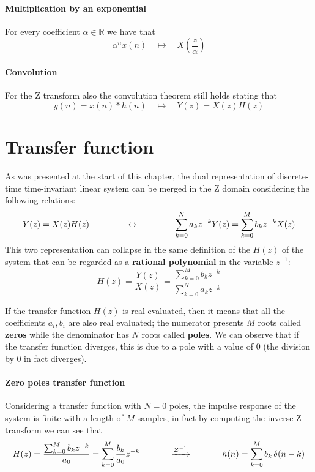 		\paragraph{Multiplication by an exponential} For every coefficient $\alpha \in \mathds R$ we have that
		\begin{equation}
			\alpha^nx(n) \quad \mapsto \quad X\left( \frac z \alpha \right)
		\end{equation}
		
		\paragraph{Convolution} For the Z transform also the convolution theorem still holds stating that
		\begin{equation}
			y(n) = x(n) * h(n) \quad \mapsto \quad Y(z) = X(z)H(z)
		\end{equation}
	
\section{Transfer function}
	As was presented at the start of this chapter, the dual representation of discrete-time time-invariant linear system can be merged in the Z domain considering the following relations:
	\begin{equation}
		Y(z) = X(z)H(z) \hspace{1.5cm} \leftrightarrow \hspace{1.5cm} \sum_{k=0}^N a_k z^{-k} Y(z) = \sum_{k=0}^M b_k z^{-k} X(z)
	\end{equation}
	This two representation can collapse in the same definition of the  $H(z)$ of the system that can be regarded as a \textbf{rational polynomial} in the variable $z^{-1}$:
	\begin{equation}
		H(z) = \frac{Y(z)}{X(z)} = \frac{\sum_{k=0}^M b_k z^{-k}}{\sum_{k=0}^N a_k z^{-k}}
	\end{equation}
	
	If the transfer function $H(z)$ is real evaluated, then it means that all the coefficients $a_i,b_i$ are also real evaluated; the numerator presents $M$ roots called \textbf{zeros} while the denominator has $N$ roots called \textbf{poles}. We can observe that if the transfer function diverges, this is due to a pole with a value of 0 (the division by 0 in fact diverges).
	
	\paragraph{Zero poles transfer function} Considering a transfer function with $N=0$ poles, the impulse response of the system is finite with a length of $M$ samples, in fact by computing the inverse Z transform we can see that
	\begin{equation} \label{eq:z:zeropoles}
		H(z) = \frac{\sum_{k=0}^M b_k z^{-k}}{a_0} = \sum_{k=0}^M \frac{b_k}{a_0} z^{-k} \hspace{1.2cm} \xrightarrow{\mathcal Z^{-1}} \hspace{1.22cm} h(n) = \sum_{k=0}^M b_k\, \delta(n-k)
	\end{equation}
	
